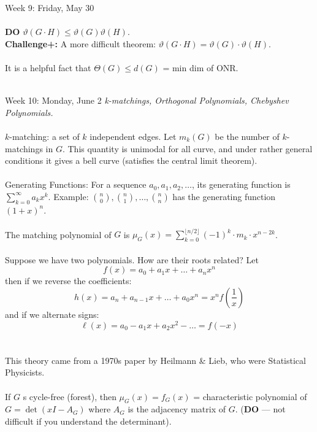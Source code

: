\documentclass[12pt]{article}
\theoremstyle{remark}
\begin{document}
\begin{section}{Week 9: Friday, May 30}
\\\\
\textbf{DO} $\vartheta(G \cdot H) \leq \vartheta(G) \vartheta(H)$.
\\\textbf{Challenge+:} A more difficult theorem: $\vartheta(G \cdot H) = \vartheta(G) \cdot \vartheta(H)$.
\\\\
It is a helpful fact that $\Theta(G) \leq d(G) $ = min dim of ONR.
\\\\
\end{section}
\newpage
\label{27}\begin{section}
{Week 10: Monday, June 2}
\indent\textit{k-matchings, Orthogonal Polynomials, Chebyshev Polynomials.}\\\\
$k$-matching: a set of $k$ independent edges. Let $m_k(G)$ be the number of $k$-matchings in $G$. This quantity is unimodal for all curve, and under rather general conditions it gives a bell curve (satisfies the central limit theorem). 
\\\\
Generating Functions: For a sequence $a_0,a_1,a_2,\ldots$, its generating function is $\sum_{k = 0}^\infty a_k x^k$. Example: ${n \choose 0},{n \choose 1},\ldots,{n \choose n}$ has the generating function $(1+x)^n$.
\\\\
The matching polynomial of $G$ is $\mu_G(x) = \sum_{k=0}^{\lfloor n/2 \rfloor} (-1)^k \cdot m_k \cdot x^{n-2k}$.
\\\\
Suppose we have two polynomials. How are their roots related? Let
$$f(x) = a_0 + a_1x + \ldots + a_n x^n$$
then if we reverse the coefficients:
 $$h(x) = a_n + a_{n-1}x + \ldots + a_0x^n = x^n f\left(\frac 1 x\right)$$
 and if we alternate signs:
$$\ell(x) = a_0 - a_1x + a_2x^2 - \ldots = f(-x)$$
\\\\
This theory came from a 1970s paper by Heilmann \& Lieb, who were Statistical Physicists. 
\\\\
If $G$ s cycle-free (forest), then $\mu_G(x) = f_G(x)$ = characteristic polynomial of $G = \det (xI - A_G)$ where $A_G$ is the adjacency matrix of $G$. (\textbf{DO} --- not difficult if you understand the determinant).
\\\\

\end{section}
\end{document}
